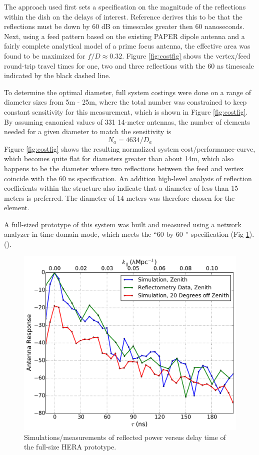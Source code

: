 \documentclass{article}
\begin{document}
The approach used first sets a specification on the magnitude of the reflections within the dish on the delays of interest.  Reference \cite{heraMemo5} derives this to be that the reflections must be down by 60 dB on timescales greater then 60 nanoseconds.  
Next, using a feed pattern based on the existing PAPER dipole antenna and a fairly complete analytical model of a prime focus antenna, the effective area was found to be maximized for $f/D \approx 0.32$.  Figure \ref{fig:costfig} shows the vertex/feed round-trip travel times for one, two and three reflections with the 60 ns timescale indicated by the black dashed line. 

To determine the optimal diameter, full system costings were done on a range of diameter sizes from 5m - 25m, where the total number was constrained to keep constant sensitivity for this measurement, which is shown in Figure \ref{fig:costfig}.  By assuming canonical values of 331 14-meter antennas, the number of elements needed for a given diameter to match the sensitivity is
\begin{equation}
N_a = 4634/D_a
\end{equation}
Figure \ref{fig:costfig} shows the resulting normalized system cost/performance-curve, which becomes quite flat for diameters greater than about 14m, which also happens to be the diameter where two reflections between the feed and vertex coincide with the 60 ns specification.  An addition high-level analysis of reflection coefficients within the structure also indicate that a diameter of less than 15 meters is preferred.  The diameter of 14 meters was therefore chosen for the element.

A full-sized prototype of this system was built and measured using a network analyzer in time-domain mode, which meets the ``60 by 60 '' specification (Fig \ref{fig:refl}). (\cite{heraMemo5}).

\begin{figure}[t]
\centerline{
\includegraphics[width=\textwidth]{plots/compareSimToDataNormalized.pdf} 
}
\caption{\small Simulations/measurements of reflected power versus delay time of the full-size HERA prototype.
\label{fig:refl}}
\end{figure}
\end{document}
